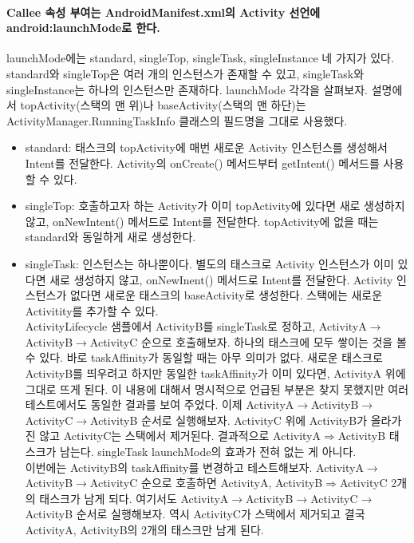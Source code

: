 \paragraph{Callee 속성 부여는 AndroidManifest.xml의 Activity 선언에 android:launchMode로 한다.}
launchMode에는 standard, singleTop, singleTask, singleInstance 네 가지가 있다. standard와 singleTop은 여러 개의 인스턴스가 존재할 수 있고, singleTask와 singleInstance는 하나의 인스턴스만 존재하다. launchMode 각각을 살펴보자. 설명에서 topActivity(스택의 맨 위)나 baseActivity(스택의 맨 하단)는  ActivityManager.RunningTaskInfo 클래스의 필드명을 그대로 사용했다.
\begin{itemize}
\item standard: 태스크의 topActivity에 매번 새로운 Activity 인스턴스를 생성해서 Intent를 전달한다. Activity의 onCreate() 메서드부터 getIntent() 메서드를 사용할 수 있다.
\item singleTop: 호출하고자 하는 Activity가 이미 topActivity에 있다면 새로 생성하지 않고, onNewIntent() 메서드로 Intent를 전달한다. topActivity에 없을 때는 standard와 동일하게 새로 생성한다.
\item singleTask: 인스턴스는 하나뿐이다. 별도의 태스크로 Activity 인스턴스가 이미 있다면 새로 생성하지 않고, onNewInent() 메서드로 Intent를 전달한다. 
Activity 인스턴스가 없다면 새로운 태스크의 baseActivity로 생성한다. 스택에는 새로운 Activitity를 추가할 수 있다.\\

ActivityLifecycle 샘플에서 ActivityB를 singleTask로 정하고, ActivityA$\rightarrow$ActivityB$\rightarrow$ActivityC 순으로 호출해보자. 하나의 태스크에 모두 쌓이는 것을 볼 수 있다. 바로 taskAffinity가 동일할 때는 아무 의미가 없다. 새로운 태스크로 ActivityB를 띄우려고 하지만 동일한 taskAffinity가 이미 있다면,  ActivityA 위에 그대로 뜨게 된다. 이 내용에 대해서 명시적으로 언급된 부분은 찾지 못했지만 여러 테스트에서도 동일한 결과를 보여 주었다. 이제 ActivityA$\rightarrow$ActivityB$\rightarrow$ActivityC$\rightarrow$ActivityB 순서로 실행해보자. ActivityC 위에 ActivityB가 올라가진 않고 ActivityC는 스택에서 제거된다. 결과적으로 ActivityA$\Rightarrow$ActivityB 태스크가 남는다. singleTask launchMode의 효과가 전혀 없는 게 아니다.\\

이번에는 ActivityB의 taskAffinity를 변경하고 테스트해보자. ActivityA$\rightarrow$ActivityB$\rightarrow$ActivityC 순으로 호출하면 ActivityA, ActivityB$\Rightarrow$ActivityC 2개의 태스크가 남게 되다. 
여기서도 ActivityA$\rightarrow$Activi\-tyB$\rightarrow$ActivityC$\rightarrow$ActivityB 순서로 실행해보자. 역시 ActivityC가 스택에서 제거되고 결국 ActivityA, ActivityB의 2개의 태스크만 남게 된다.\\


\end{itemize}
